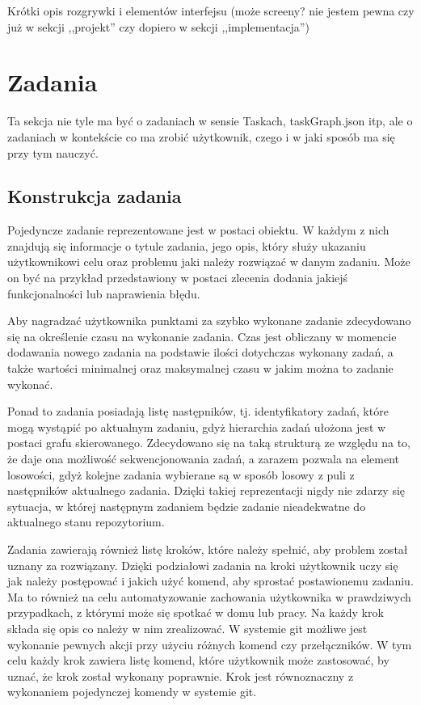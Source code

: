 \documentclass[11pt,a4paper,polish,thesis]{dcsbook}
\begin{document}
	Krótki opis rozgrywki i elementów interfejsu (może screeny? nie jestem pewna czy już w sekcji ,,projekt'' czy dopiero w sekcji ,,implementacja'')
	
	\section{Zadania}
	
	Ta sekcja nie tyle ma być o zadaniach w sensie Taskach, taskGraph.json itp, ale o zadaniach w kontekście co ma zrobić użytkownik, czego i w jaki sposób ma się przy tym nauczyć.
	
	\subsection{Konstrukcja zadania}
	Pojedyncze zadanie reprezentowane jest w postaci obiektu. W każdym z nich znajdują się informacje o tytule zadania, jego opis, który służy ukazaniu użytkownikowi celu oraz problemu jaki należy rozwiązać w danym zadaniu. Może on być na przykład przedstawiony w postaci zlecenia dodania jakiejś funkcjonalności lub naprawienia błędu. 
	
Aby nagradzać użytkownika punktami za szybko wykonane zadanie zdecydowano się na określenie czasu na wykonanie zadania. Czas jest obliczany w momencie dodawania nowego zadania na podstawie ilości dotychczas wykonany zadań, a także wartości minimalnej oraz maksymalnej czasu w jakim można to zadanie wykonać.
	 
Ponad to zadania posiadają listę następników, tj. identyfikatory zadań, które mogą wystąpić po aktualnym zadaniu, gdyż hierarchia zadań ułożona jest w postaci grafu skierowanego. Zdecydowano się na taką strukturą ze względu na to, że daje ona możliwość sekwencjonowania zadań, a zarazem pozwala na element losowości, gdyż kolejne zadania wybierane są w sposób losowy z puli z następników aktualnego zadania. Dzięki takiej reprezentacji nigdy nie zdarzy się sytuacja, w której następnym zadaniem będzie zadanie nieadekwatne do aktualnego stanu repozytorium.


Zadania zawierają również listę kroków, które należy spełnić, aby problem został uznany za rozwiązany. 
Dzięki podziałowi zadania na kroki użytkownik uczy się jak należy postępować i jakich użyć komend, aby sprostać postawionemu zadaniu. Ma to również na celu automatyzowanie zachowania użytkownika w prawdziwych przypadkach, z którymi może się spotkać w domu lub pracy. Na każdy krok składa się opis co należy w nim zrealizować. W systemie git możliwe jest wykonanie pewnych akcji przy użyciu różnych komend czy przełączników. W tym celu każdy krok zawiera listę komend, które użytkownik może zastosować, by uznać, że krok został wykonany poprawnie. Krok jest równoznaczny z wykonaniem pojedynczej komendy w systemie git.
\end{document}
